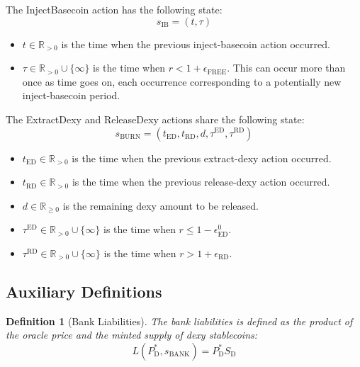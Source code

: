 \documentclass{ifcolog}
\newcommand{\Pdt}{P_{\mathrm{D}}^{*}}
\newcommand{\Sd}{S_{\mathrm{D}}}
\newcommand{\sbank}{s_{\textrm{BANK}}}
\newtheorem{definition}{Definition}
\begin{document}
The InjectBasecoin action has the following state:
$$s_{\textrm{IB}} = \left(t, \tau\right)$$

\begin{itemize}
  \item $t \in \mathbb{R}_{>0}$ is the time when the previous inject-basecoin action occurred.
  \item $\tau \in \mathbb{R}_{>0}\cup\{\infty\}$ is the time when $r < 1 + \epsilon_{\textrm{FREE}}$. This can occur more than once as time goes on,
        each occurrence corresponding to a potentially new inject-basecoin period.
\end{itemize}

The ExtractDexy and ReleaseDexy actions share the following state:
$$s_{\textrm{BURN}} = \left(t_{\textrm{ED}}, t_{\textrm{RD}}, d, \tau^{\textrm{ED}}, \tau^{\textrm{RD}} \right)$$

\begin{itemize}
  \item $t_{\textrm{ED}} \in \mathbb{R}_{>0}$ is the time when the previous extract-dexy action occurred.
  \item $t_{\textrm{RD}} \in \mathbb{R}_{>0}$ is the time when the previous release-dexy action occurred.
  \item $d \in \mathbb{R}_{\ge 0}$ is the remaining dexy amount to be released.
  \item $\tau^{\textrm{ED}} \in \mathbb{R}_{>0}\cup\{\infty\}$ is the time when $r \le 1 - \epsilon_{\textrm{ED}}^{0}$. 
  \item $\tau^{\textrm{RD}} \in \mathbb{R}_{>0}\cup\{\infty\}$ is the time when $r > 1 + \epsilon_{\textrm{RD}}$.  
\end{itemize}

\subsection{Auxiliary Definitions}

\begin{definition}[Bank Liabilities]
  The bank liabilities is defined as the product of 
  the oracle price and the minted supply of dexy stablecoins:
  \begin{equation}
    L(\Pdt, \sbank) = \Pdt \Sd
  \end{equation}
\end{definition}
\end{document}
